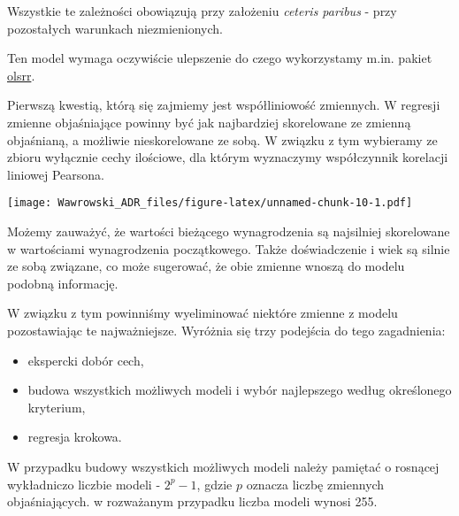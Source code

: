 \documentclass[]{book}
\newenvironment{Shaded}{\begin{snugshade}}{\end{snugshade}}
\newcommand{\KeywordTok}[1]{\textcolor[rgb]{0.13,0.29,0.53}{\textbf{#1}}}
\newcommand{\DataTypeTok}[1]{\textcolor[rgb]{0.13,0.29,0.53}{#1}}
\newcommand{\StringTok}[1]{\textcolor[rgb]{0.31,0.60,0.02}{#1}}
\newcommand{\OperatorTok}[1]{\textcolor[rgb]{0.81,0.36,0.00}{\textbf{#1}}}
\newcommand{\NormalTok}[1]{#1}
\providecommand{\tightlist}{%
  \setlength{\itemsep}{0pt}\setlength{\parskip}{0pt}}
\begin{document}
Wszystkie te zależności obowiązują przy założeniu \emph{ceteris paribus}
- przy pozostałych warunkach niezmienionych.

Ten model wymaga oczywiście ulepszenie do czego wykorzystamy m.in.
pakiet
\href{https://cran.r-project.org/web/packages/olsrr/index.html}{olsrr}.

Pierwszą kwestią, którą się zajmiemy jest współliniowość zmiennych. W
regresji zmienne objaśniające powinny być jak najbardziej skorelowane ze
zmienną objaśnianą, a możliwie nieskorelowane ze sobą. W związku z tym
wybieramy ze zbioru wyłącznie cechy ilościowe, dla którym wyznaczymy
współczynnik korelacji liniowej Pearsona.

\begin{Shaded}
\end{Shaded}

\texttt{[image: Wawrowski\_ADR\_files/figure-latex/unnamed-chunk-10-1.pdf]}

Możemy zauważyć, że wartości bieżącego wynagrodzenia są najsilniej
skorelowane w wartościami wynagrodzenia początkowego. Także
doświadczenie i wiek są silnie ze sobą związane, co może sugerować, że
obie zmienne wnoszą do modelu podobną informację.

W związku z tym powinniśmy wyeliminować niektóre zmienne z modelu
pozostawiając te najważniejsze. Wyróżnia się trzy podejścia do tego
zagadnienia:

\begin{itemize}
\tightlist
\item
  ekspercki dobór cech,
\item
  budowa wszystkich możliwych modeli i wybór najlepszego według
  określonego kryterium,
\item
  regresja krokowa.
\end{itemize}

W przypadku budowy wszystkich możliwych modeli należy pamiętać o
rosnącej wykładniczo liczbie modeli - \(2^p-1\), gdzie \(p\) oznacza
liczbę zmiennych objaśniających. w rozważanym przypadku liczba modeli
wynosi 255.
\end{document}
